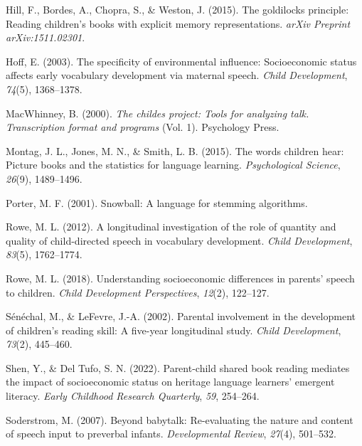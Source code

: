 \documentclass[10pt, letterpaper]{article}
\begin{document}
\leavevmode\hypertarget{ref-hill2015goldilocks}{}%
Hill, F., Bordes, A., Chopra, S., \& Weston, J. (2015). The goldilocks
principle: Reading children's books with explicit memory
representations. \emph{arXiv Preprint arXiv:1511.02301}.

\leavevmode\hypertarget{ref-hoff2003specificity}{}%
Hoff, E. (2003). The specificity of environmental influence:
Socioeconomic status affects early vocabulary development via maternal
speech. \emph{Child Development}, \emph{74}(5), 1368--1378.

\leavevmode\hypertarget{ref-macwhinney2000childes}{}%
MacWhinney, B. (2000). \emph{The childes project: Tools for analyzing
talk. Transcription format and programs} (Vol. 1). Psychology Press.

\leavevmode\hypertarget{ref-montag2015words}{}%
Montag, J. L., Jones, M. N., \& Smith, L. B. (2015). The words children
hear: Picture books and the statistics for language learning.
\emph{Psychological Science}, \emph{26}(9), 1489--1496.

\leavevmode\hypertarget{ref-porter2001snowball}{}%
Porter, M. F. (2001). Snowball: A language for stemming algorithms.

\leavevmode\hypertarget{ref-rowe2012longitudinal}{}%
Rowe, M. L. (2012). A longitudinal investigation of the role of quantity
and quality of child-directed speech in vocabulary development.
\emph{Child Development}, \emph{83}(5), 1762--1774.

\leavevmode\hypertarget{ref-rowe2018understanding}{}%
Rowe, M. L. (2018). Understanding socioeconomic differences in parents'
speech to children. \emph{Child Development Perspectives}, \emph{12}(2),
122--127.

\leavevmode\hypertarget{ref-senechal2002parental}{}%
Sénéchal, M., \& LeFevre, J.-A. (2002). Parental involvement in the
development of children's reading skill: A five-year longitudinal study.
\emph{Child Development}, \emph{73}(2), 445--460.

\leavevmode\hypertarget{ref-shen2022parent}{}%
Shen, Y., \& Del Tufo, S. N. (2022). Parent-child shared book reading
mediates the impact of socioeconomic status on heritage language
learners' emergent literacy. \emph{Early Childhood Research Quarterly},
\emph{59}, 254--264.

\leavevmode\hypertarget{ref-soderstrom2007beyond}{}%
Soderstrom, M. (2007). Beyond babytalk: Re-evaluating the nature and
content of speech input to preverbal infants. \emph{Developmental
Review}, \emph{27}(4), 501--532.


\end{document}
